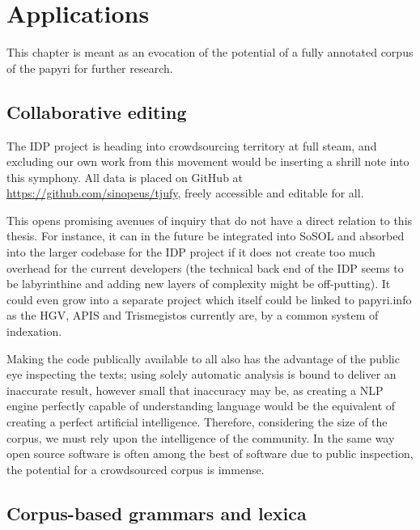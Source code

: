 \chapter{Applications} %
\label{cha:applications}
This chapter is meant as an evocation of the potential of a fully annotated corpus of the papyri for further research.

\section{Collaborative editing} %
\label{sec:collaborativeediting}

The IDP project is heading into crowdsourcing territory at full steam, and
excluding our own work from this movement would be inserting a shrill note into
this symphony. All data is placed on GitHub at
\url{https://github.com/sinopeus/tjufy}, freely accessible and editable for
all. 

This opens promising avenues of inquiry that do not have a direct relation
to this thesis. For instance, it can in the future be integrated into SoSOL and
absorbed into the larger codebase for the IDP project if it does not create too
much overhead for the current developers (the technical back end of the IDP
seems to be labyrinthine and adding new layers of complexity might be
off-putting). It could even grow into a separate project which itself could be
linked to papyri.info as the HGV, APIS and Trismegistos currently are, by a
common system of indexation.

Making the code publically available to all also has the advantage of the
public eye inspecting the texts; using solely automatic analysis is bound to
deliver an inaccurate result, however small that inaccuracy may be, as creating
a NLP engine perfectly capable of understanding language would be the
equivalent of creating a perfect artificial intelligence. Therefore,
considering the size of the corpus, we must rely upon the intelligence of the
community. In the same way open source software is often among the best of
software due to public inspection, the potential for a crowdsourced corpus is
immense.


\section{Corpus-based grammars and lexica} %
\label{sec:corpusbasedgrammars}

